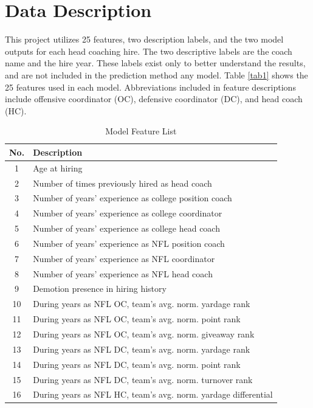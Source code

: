 \documentclass[conference]{IEEEtran}
\begin{document}
\section{Data Description}
This project utilizes 25 features, two description labels, and the two model outputs for each head coaching hire. The two descriptive labels are the coach name and the hire year. These labels exist only to better understand the results, and are not included in the prediction method any model. Table \ref{tab1} shows the 25 features used in each model. Abbreviations included in feature descriptions include offensive coordinator (OC), defensive coordinator (DC), and head coach (HC).

\begin{table}[htbp]
\caption{Model Feature List}
\begin{center}
\begin{tabular}{|c||l|}
\hline
\textbf{No.} & \textbf{Description} \\
\hline
\hline
1 & Age at hiring \\
\hline
2 & Number of times previously hired as head coach \\
\hline
3 & Number of years’ experience as college position coach \\
\hline
4 & Number of years’ experience as college coordinator \\
\hline
5 & Number of years’ experience as college head coach \\
\hline
6 & Number of years’ experience as NFL position coach \\
\hline
7 & Number of years’ experience as NFL coordinator \\
\hline
8 & Number of years’ experience as NFL head coach \\
\hline
9 & Demotion presence in hiring history \\
\hline
10 & During years as NFL OC, team’s avg. norm. yardage rank \\
\hline
11 & During years as NFL OC, team’s avg. norm. point rank \\
\hline
12 & During years as NFL OC, team’s avg. norm. giveaway rank \\
\hline
13 & During years as NFL DC, team’s avg. norm. yardage rank \\
\hline
14 & During years as NFL DC, team’s avg. norm. point rank \\
\hline
15 & During years as NFL DC, team’s avg. norm. turnover rank \\
\hline
16 & During years as NFL HC, team’s avg. norm. yardage differential\\

\end{tabular}
\end{center}
\end{table}
\end{document}
